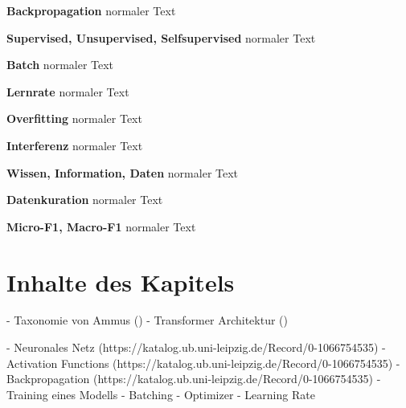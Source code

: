 \begin{definition}
    \textbf{Backpropagation} normaler Text
\end{definition}

\begin{definition}
    \textbf{Supervised, Unsupervised, Selfsupervised} normaler Text
\end{definition}

\begin{definition}
    \textbf{Batch} normaler Text
\end{definition}

\begin{definition}
    \textbf{Lernrate} normaler Text
\end{definition}

\begin{definition}
    \textbf{Overfitting} normaler Text
\end{definition}

\begin{definition}
    \textbf{Interferenz} normaler Text
\end{definition}


\begin{definition}
    \textbf{Wissen, Information, Daten} normaler Text
\end{definition}

\begin{definition}
    \textbf{Datenkuration} normaler Text
\end{definition}

\begin{definition}
    \textbf{Micro-F1, Macro-F1} normaler Text
\end{definition}

















\section*{Inhalte des Kapitels}
- Taxonomie von Ammus (\citet{ammus}) %
- Transformer Architektur (\citet{attention}) %

- Neuronales Netz (https://katalog.ub.uni-leipzig.de/Record/0-1066754535) %
- Activation Functions (https://katalog.ub.uni-leipzig.de/Record/0-1066754535) %
- Backpropagation (https://katalog.ub.uni-leipzig.de/Record/0-1066754535)%
- Training eines Modells %
    - Batching %
    - Optimizer %
    - Learning Rate %

